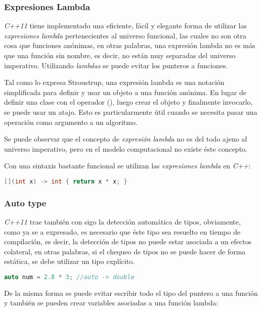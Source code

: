 	\subsubsection{Expresiones Lambda}
		\emph{C++11} tiene implementado una eficiente, fácil y elegante forma de utilizar las \emph{expresiones lambda} pertenecientes al universo funcional, las cuales no son otra cosa que funciones anónimas, en otras palabras, una expresión lambda no es más que una función sin nombre, es decir, no están muy separadas del universo imperativo. Utilizando \emph{lambdas} se puede evitar los punteros a funciones.
		
		Tal como lo expresa Stroustrup, una expresión lambda es una notación simplificada para definir y usar un objeto a una función anónima. En lugar de definir una clase con el operador (), luego crear el objeto y finalmente invocarlo, se puede usar un atajo. Esto es particularmente útil cuando se necesita pasar una operación como argumento a un algoritmo.\cite{Bjarne2013}
		
		Se puede observar que el concepto de \emph{expresión lambda} no es del todo ajeno al universo imperativo, pero en el modelo computacional no existe éste concepto.
		
		Con una sintaxis bastante funcional se utilizan las \emph{expresiones lambda} en \emph{C++}:
		
		\begin{lstlisting}[language=C++, caption=Lambda para elevar al cuadrado un número en C++]
			[](int x) -> int { return x * x; }
		\end{lstlisting}
	
	\subsubsection{Auto type}
		\emph{C++11} trae también con sigo la detección automática de tipos, obviamente, como ya se a expresado, es necesario que éste tipo sea resuelto en tiempo de compilación, es decir, la detección de tipos no puede estar asociada a un efectos colateral, en otras palabras, si el chequeo de tipos no se puede hacer de forma estática, se debe utilizar un tipo explícito.
	
		\begin{lstlisting}[language=C++, caption=Auto type en C++]
			auto num = 2.8 * 3; //auto -> double
		\end{lstlisting}
		
		De la misma forma se puede evitar escribir todo el tipo del puntero a una función y también se pueden crear variables asociadas a una función lambda:
		

